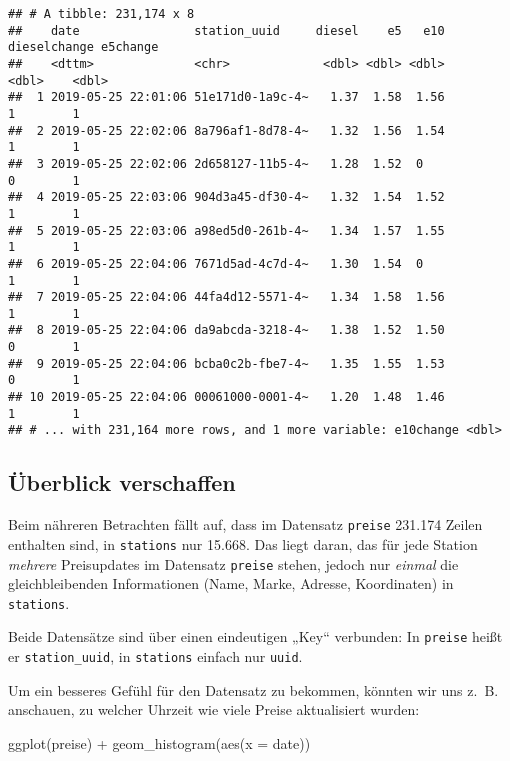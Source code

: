 \documentclass[11pt,german,a4paper]{article}
\newenvironment{Shaded}{\begin{snugshade}}{\end{snugshade}}
\newcommand{\AttributeTok}[1]{\textcolor[rgb]{0.77,0.63,0.00}{#1}}
\newcommand{\FunctionTok}[1]{\textcolor[rgb]{0.00,0.00,0.00}{#1}}
\newcommand{\NormalTok}[1]{#1}
\newcommand{\SpecialCharTok}[1]{\textcolor[rgb]{0.00,0.00,0.00}{#1}}
\begin{document}
\begin{verbatim}
## # A tibble: 231,174 x 8
##    date                station_uuid     diesel    e5   e10 dieselchange e5change
##    <dttm>              <chr>             <dbl> <dbl> <dbl>        <dbl>    <dbl>
##  1 2019-05-25 22:01:06 51e171d0-1a9c-4~   1.37  1.58  1.56            1        1
##  2 2019-05-25 22:02:06 8a796af1-8d78-4~   1.32  1.56  1.54            1        1
##  3 2019-05-25 22:02:06 2d658127-11b5-4~   1.28  1.52  0               0        1
##  4 2019-05-25 22:03:06 904d3a45-df30-4~   1.32  1.54  1.52            1        1
##  5 2019-05-25 22:03:06 a98ed5d0-261b-4~   1.34  1.57  1.55            1        1
##  6 2019-05-25 22:04:06 7671d5ad-4c7d-4~   1.30  1.54  0               1        1
##  7 2019-05-25 22:04:06 44fa4d12-5571-4~   1.34  1.58  1.56            1        1
##  8 2019-05-25 22:04:06 da9abcda-3218-4~   1.38  1.52  1.50            0        1
##  9 2019-05-25 22:04:06 bcba0c2b-fbe7-4~   1.35  1.55  1.53            0        1
## 10 2019-05-25 22:04:06 00061000-0001-4~   1.20  1.48  1.46            1        1
## # ... with 231,164 more rows, and 1 more variable: e10change <dbl>
\end{verbatim}

\hypertarget{uxfcberblick-verschaffen-1}{%
\subsection{Überblick verschaffen}\label{uxfcberblick-verschaffen-1}}

Beim nähreren Betrachten fällt auf, dass im Datensatz \texttt{preise} 231.174 Zeilen enthalten sind, in \texttt{stations} nur 15.668. Das liegt daran, das für jede Station \emph{mehrere} Preisupdates im Datensatz \texttt{preise} stehen, jedoch nur \emph{einmal} die gleichbleibenden Informationen (Name, Marke, Adresse, Koordinaten) in \texttt{stations}.

Beide Datensätze sind über einen eindeutigen „Key`` verbunden: In \texttt{preise} heißt er \texttt{station\_uuid}, in \texttt{stations} einfach nur \texttt{uuid}.

Um ein besseres Gefühl für den Datensatz zu bekommen, könnten wir uns z.~B. anschauen, zu welcher Uhrzeit wie viele Preise aktualisiert wurden:

\begin{Shaded}
\begin{Highlighting}[]
\FunctionTok{ggplot}\NormalTok{(preise) }\SpecialCharTok{+}
  \FunctionTok{geom\_histogram}\NormalTok{(}\FunctionTok{aes}\NormalTok{(}\AttributeTok{x =}\NormalTok{ date))}
\end{Highlighting}
\end{Shaded}
\end{document}
